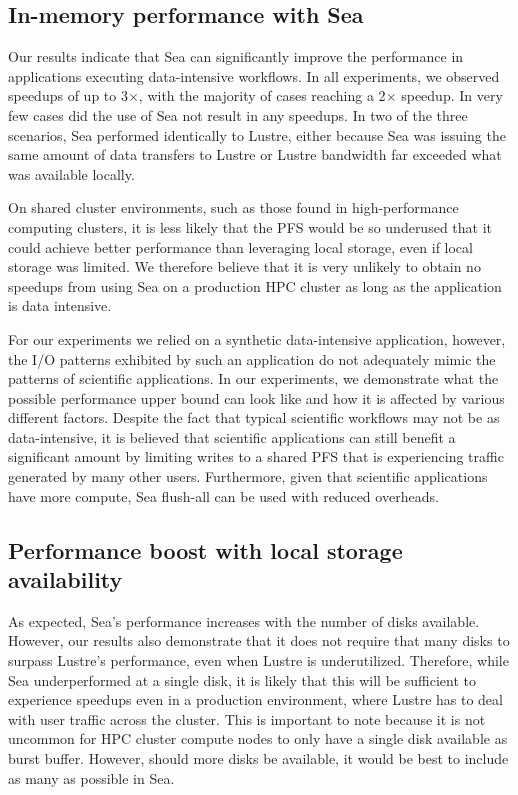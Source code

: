 \documentclass[10pt,journal,compsoc]{IEEEtran}
\begin{document}
    \subsection{In-memory performance with Sea}
   
    Our results indicate that Sea can significantly improve the performance in
    applications executing data-intensive workflows. In all experiments, we
    observed speedups of up to 3$\times$, with the majority of cases reaching a
    2$\times$ speedup. In very few cases did the use of Sea not result in any
    speedups. In two of the three scenarios, Sea performed identically to
    Lustre, either because Sea was issuing the same amount of data transfers to
    Lustre or Lustre bandwidth far exceeded what was available locally.

    On shared cluster environments, such as those found in high-performance
    computing clusters, it is less likely that the PFS would be so underused
    that it could achieve better performance than leveraging local storage, even
    if local storage was limited. We therefore believe that it is very unlikely to
    obtain no speedups from using Sea on a production HPC cluster as long as the
    application is data intensive.
    
    For our experiments we relied on a synthetic data-intensive application,
    however, the I/O patterns exhibited by such an application do not adequately
    mimic the patterns of scientific applications. In our experiments, we
    demonstrate what the possible performance upper bound can look like and how
    it is affected by various different factors. Despite the fact that typical
    scientific workflows may not be as data-intensive, it is believed that
    scientific applications can still benefit a significant amount by limiting
    writes to a shared PFS that is experiencing traffic generated by many other
    users. Furthermore, given that scientific applications have more compute,
    Sea flush-all can be used with reduced overheads.

    \subsection{Performance boost with local storage availability}

    As expected, Sea's performance increases with the number of disks available.
    However, our results also demonstrate that it does not require that many
    disks to surpass Lustre's performance, even when Lustre is underutilized.
    Therefore, while Sea underperformed at a single disk, it is likely that this
    will be sufficient to experience speedups even in a production environment,
    where Lustre has to deal with user traffic across the cluster. This is
    important to note because it is not uncommon for HPC cluster compute nodes
    to only have a single disk available as burst buffer. However, should more
    disks be available, it would be best to include as many as possible in Sea.
\end{document}
